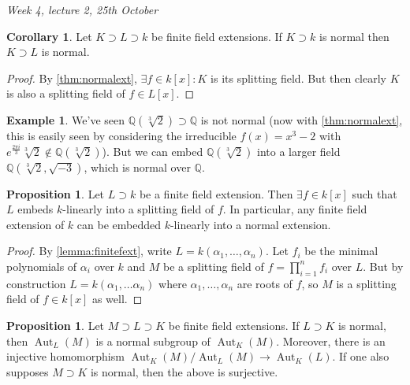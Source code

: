 \documentclass{article}
\newcommand{\Q}{\mathbb{Q}}
\newcommand{\Aut}{\operatorname{Aut}}
\theoremstyle{definition}
\newtheorem{prop}[defn]{Proposition}
\newtheorem{coro}[defn]{Corollary}
\newtheorem{example}[defn]{Example}
\begin{document}
\begin{flushright}
\textit{Week 4, lecture 2, 25th October}
\end{flushright}

\begin{coro}
\label{coro:KknormalKLnormal}
Let $K\supset L\supset k$ be finite field extensions. If $K\supset k$ is normal then $K\supset L$ is normal.
\end{coro}
\begin{proof}
By \ref{thm:normalext}, $\exists f\in k[x]:K$ is its splitting field. But then clearly $K$ is also a splitting field of $f\in L[x]$.
\end{proof}

\begin{example}
We've seen $\Q(\sqrt[3]2)\supset\Q$ is not normal (now with \ref{thm:normalext}, this is easily seen by considering the irreducible $f(x)=x^3-2$ with $e^{\frac{2\pi i}{3}}\sqrt[3]2\notin\Q(\sqrt[3]2)$). But we can embed $\Q(\sqrt[3]2)$ into a larger field $\Q(\sqrt[3]2,\sqrt{-3})$, which is normal over $\Q$.
\end{example}

\begin{prop}
Let $L\supset k$ be a finite field extension. Then $\exists f\in k[x]$ such that $L$ embeds $k$-linearly into a splitting field of $f$. In particular, any finite field extension of $k$ can be embedded $k$-linearly into a normal extension.
\end{prop}
\begin{proof}
By \ref{lemma:finitefext}, write $L=k(\alpha_1,\ldots,\alpha_n)$. Let $f_i$ be the minimal polynomials of $\alpha_i$ over $k$ and $M$ be a splitting field of $f=\prod_{i=1}^n f_i$ over $L$. But by construction $L=k(\alpha_1,\ldots\alpha_n)$ where $\alpha_1,\ldots,\alpha_n$ are roots of $f$, so $M$ is a splitting field of $f\in k[x]$ as well.
\end{proof}

\begin{prop}
\label{prop:AKMqALMisAKL}
Let $M\supset L\supset K$ be finite field extensions. If $L\supset K$ is normal, then $\Aut_L(M)$ is a normal subgroup of $\Aut_K(M)$. Moreover, there is an injective homomorphism $\Aut_K(M)/\Aut_L(M)\rightarrow\Aut_K(L)$. If one also supposes $M\supset K$ is normal, then the above is surjective.
\end{prop}
\end{document}
